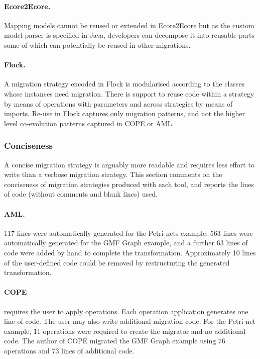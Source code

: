 \paragraph{Ecore2Ecore.} Mapping models cannot be reused or extended in Ecore2Ecore but as the custom model parser is specified in Java, developers can decompose it into reusable parts some of which can potentially be reused in other migrations.

\paragraph{Flock.} A migration strategy encoded in Flock is modularised according to the classes whose instances need migration. There is support to reuse code within a strategy by means of operations with parameters and across strategies by means of imports. Re-use in Flock captures only migration patterns, and not the higher level co-evolution patterns captured in COPE or AML.



\subsubsection{Conciseness}
A concise migration strategy is arguably more readable and requires less effort to write than a verbose migration strategy. This section comments on the conciseness of migration strategies produced with each tool, and reports the lines of code (without comments and blank lines) used.

\paragraph{AML.} 117 lines were automatically generated for the Petri nets example. 563 lines were automatically generated for the GMF Graph example, and a further 63 lines of code were added by hand to complete the transformation. Approximately 10 lines of the user-defined code could be removed by restructuring the generated transformation. 

\paragraph{COPE} requires the user to apply operations. Each operation application generates one line of code. The user may also write additional migration code. For the Petri net example, 11 operations were required to create the migrator and no additional code. The author of COPE migrated the GMF Graph example using 76 operations and 73 lines of additional code.

